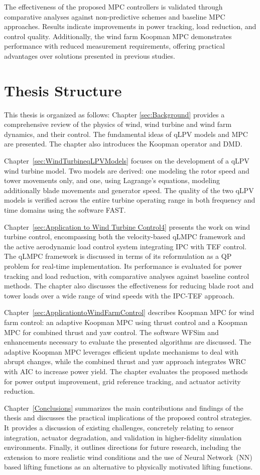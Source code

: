 The effectiveness of the proposed MPC controllers is validated through comparative analyses against non-predictive schemes and baseline MPC approaches. Results indicate improvements in power tracking, load reduction, and control quality. Additionally, the wind farm Koopman MPC demonstrates performance with reduced measurement requirements, offering practical advantages over solutions presented in previous studies.

\section{Thesis Structure}
This thesis is organized as follows: Chapter \ref{sec:Background} provides a comprehensive review of the physics of wind, wind turbine and wind farm dynamics, and their control. The fundamental ideas of qLPV models and MPC are presented. The chapter also introduces the Koopman operator and DMD.

Chapter~\ref{sec:WindTurbineqLPVModels} focuses on the development of a qLPV wind turbine model. Two models are derived: one modeling the rotor speed and tower movements only, and one, using Lagrange's equations, modeling additionally blade movements and generator speed. The quality of the two qLPV models is verified across the entire turbine operating range in both frequency and time domains using the software FAST.

Chapter~\ref{sec:Application to Wind Turbine Control4} presents the work on wind turbine control, encompassing both the velocity-based qLMPC framework and the active aerodynamic load control system integrating IPC with TEF control. The qLMPC framework is discussed in terms of its reformulation as a  QP problem for real-time implementation. Its performance is evaluated for power tracking and load reduction, with comparative analyses against baseline control methods. The chapter also discusses the effectiveness for reducing blade root and tower loads over a wide range of wind speeds with the IPC-TEF approach.   

Chapter~\ref{sec:ApplicationtoWindFarmControl} describes Koopman MPC for wind farm control: an adaptive Koopman MPC using thrust control and a Koopman MPC for combined thrust and yaw control. The software WFSim and enhancements necessary to evaluate the presented algorithms are discussed. The adaptive Koopman MPC leverages efficient update mechanisms to deal with abrupt changes, while the combined thrust and yaw approach integrates WRC with AIC to increase power yield. The chapter evaluates the proposed methods for power output improvement, grid reference tracking, and actuator activity reduction.

Chapter~\ref{Conclusions} summarizes the main contributions and findings of the thesis 
and discusses the practical implications of the proposed control strategies. It provides 
a discussion of existing challenges, concretely relating to sensor 
integration, actuator degradation, and validation in higher-fidelity simulation 
environments. Finally, it outlines directions for future research, including the 
extension to more realistic wind conditions and the use of Neural Network~(NN) based 
lifting functions as an alternative to physically motivated lifting functions.


